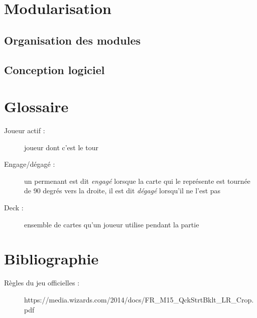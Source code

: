 \documentclass[a4paper,12pt]{article}
\begin{document}


\section{Modularisation}
\label{sec:module}

\subsection{Organisation des modules}

\clearpage
\subsection{Conception logiciel}


%

\section{Glossaire}

\begin{description}
\item[Joueur actif :] joueur dont c'est le tour
\item[Engage/dégagé :] un permenant est dit \emph{engagé} lorsque la carte qui le représente est tournée de 90 degrés vers la droite, il est dit \emph{dégagé} lorsqu'il ne l'est pas
\item[Deck :] ensemble de cartes qu'un joueur utilise pendant la partie
\end{description}


\section{Bibliographie}

\begin{description}
\item[Règles du jeu officielles :] https://media.wizards.com/2014/docs/FR\_M15\_QckStrtBklt\_LR\_Crop.pdf

\end{description}
\end{document}
